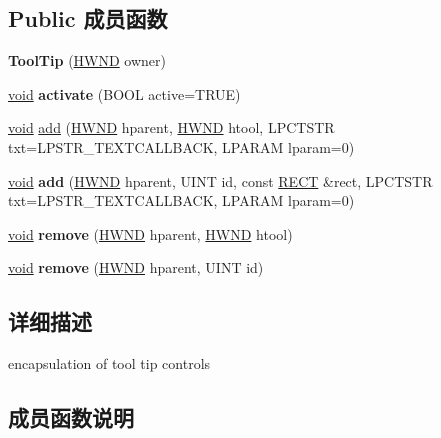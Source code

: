 \subsection*{Public 成员函数}
\begin{DoxyCompactItemize}
\item 
\mbox{\label{struct_tool_tip_ac33218efba533b12c8e628f8b17fa4c2}} 
{\bfseries Tool\+Tip} (\hyperlink{interfacevoid}{H\+W\+ND} owner)
\item 
\mbox{\label{struct_tool_tip_a1f0e577daa9180803400ae54373e3357}} 
\hyperlink{interfacevoid}{void} {\bfseries activate} (B\+O\+OL active=T\+R\+UE)
\item 
\hyperlink{interfacevoid}{void} \hyperlink{struct_tool_tip_a1f3f3b100484b08d5120678cf2d9ead5}{add} (\hyperlink{interfacevoid}{H\+W\+ND} hparent, \hyperlink{interfacevoid}{H\+W\+ND} htool, L\+P\+C\+T\+S\+TR txt=L\+P\+S\+T\+R\+\_\+\+T\+E\+X\+T\+C\+A\+L\+L\+B\+A\+CK, L\+P\+A\+R\+AM lparam=0)
\item 
\mbox{\label{struct_tool_tip_a06adb207ead081fac642bbac3f8daf54}} 
\hyperlink{interfacevoid}{void} {\bfseries add} (\hyperlink{interfacevoid}{H\+W\+ND} hparent, U\+I\+NT id, const \hyperlink{structtag_r_e_c_t}{R\+E\+CT} \&rect, L\+P\+C\+T\+S\+TR txt=L\+P\+S\+T\+R\+\_\+\+T\+E\+X\+T\+C\+A\+L\+L\+B\+A\+CK, L\+P\+A\+R\+AM lparam=0)
\item 
\mbox{\label{struct_tool_tip_ad4fae9afe7db64438711da43e5e41c6d}} 
\hyperlink{interfacevoid}{void} {\bfseries remove} (\hyperlink{interfacevoid}{H\+W\+ND} hparent, \hyperlink{interfacevoid}{H\+W\+ND} htool)
\item 
\mbox{\label{struct_tool_tip_ac8fcb8c955824591f03f9f6e875b6dcf}} 
\hyperlink{interfacevoid}{void} {\bfseries remove} (\hyperlink{interfacevoid}{H\+W\+ND} hparent, U\+I\+NT id)
\end{DoxyCompactItemize}


\subsection{详细描述}
encapsulation of tool tip controls 

\subsection{成员函数说明}
\mbox{\label{struct_tool_tip_a1f3f3b100484b08d5120678cf2d9ead5}} 
